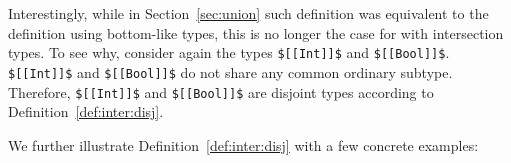 Interestingly, while in Section~\ref{sec:union} such definition was
equivalent to the definition using bottom-like types, this is no
longer the case for \name with intersection types. To see why,
consider again the types \lstinline{$[[Int]]$} and \lstinline{$[[Bool]]$}.
\lstinline{$[[Int]]$} and
\lstinline{$[[Bool]]$} do not share any common ordinary subtype. Therefore,
\lstinline{$[[Int]]$} and \lstinline{$[[Bool]]$} are disjoint types according to
Definition~\ref{def:inter:disj}.
\begin{comment}
We extend our previous example of type $[[Int]]$ and type $[[Bool]]$ and show how
disjointness based upon ordinary types categorize them as disjoint types.
An important observation at this point is common subtypes of type $[[Int]]$ and type $[[Bool]]$
cannot include either $[[Int]]$ or $[[Bool]]$. Problematic types are the intersection types
such as $[[Int /\ Bool]]$. We emphasize the point that ordinary types in \name does not contain
intersection types. Further, all ordinary types are non-overlapping in \name.
Therefore, now we say that
two types are disjoint if they do not have any common ordinary subtype. $[[Int]]$ and $[[Bool]]$
do not share any common ordinary subtype. Therefore, $[[Int]]$ and $[[Bool]]$ are disjoint types.
\Cref{def:inter:disj} shows the declarative disjointness for \name with intersection types:


\noindent Two types $[[A]]$ and $[[B]]$ are
disjoint if the two types $[[A /\ B]]$ do
not have any common ordinary subtype. For example, $[[Int]]$ and $[[A -> B]]$
are disjoint types because there is no ordinary type that is a subtype
of both types ($[[Int]]$ and $[[A -> B]]$).
\Cref{def:inter:disj} is the same as
\Cref{def:union:disj1}. However, while the \Cref{def:union:disj1} in \Cref{sec:union:discussion}
is equivalent the definition of disjointness using bottom-like types (\Cref{def:union:disj}),
in the calculus with intersection types that is no longer the case.
\end{comment}
We further illustrate
Definition~\ref{def:inter:disj} with a few concrete examples:


